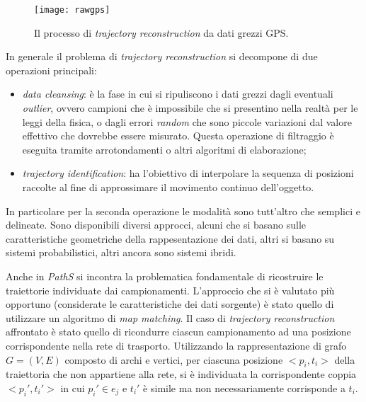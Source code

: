 \begin{figure}[h]
  \centering
  \texttt{[image: rawgps]}
  \caption{\footnotesize{Il processo di \emph{trajectory reconstruction} da dati grezzi GPS.}}
  \label{fig:rawgps}
\end{figure}

In generale il problema di \emph{trajectory reconstruction} si decompone di due operazioni principali:
\begin{itemize}
\item \emph{data cleansing}: è la fase in cui si ripuliscono i dati grezzi dagli eventuali \emph{outlier}, ovvero campioni che è impossibile che si presentino nella realtà per le leggi della fisica, o dagli errori \emph{random} che sono piccole variazioni dal valore effettivo che dovrebbe essere misurato. Questa operazione di filtraggio è eseguita tramite arrotondamenti o altri algoritmi di elaborazione;
\item \emph{trajectory identification}: ha l'obiettivo di interpolare la sequenza di posizioni raccolte al fine di approssimare il movimento continuo dell'oggetto.
\end{itemize}
In particolare per la seconda operazione le modalità sono tutt'altro che semplici e delineate. Sono disponibili diversi approcci, alcuni che si basano sulle caratteristiche geometriche della rappesentazione dei dati, altri si basano su sistemi probabilistici, altri ancora sono sistemi ibridi.

Anche in \emph{PathS} si incontra la problematica fondamentale di ricostruire le traiettorie individuate dai campionamenti. L'approccio che si è valutato più opportuno (considerate le caratteristiche dei dati sorgente) è stato quello di utilizzare un algoritmo di \emph{map matching}.
Il caso di \emph{trajectory reconstruction} affrontato è stato quello di ricondurre ciascun campionamento ad una posizione corrispondente nella rete di trasporto. Utilizzando la rappresentazione di grafo $G=(V,E)$ composto di archi e vertici, per ciascuna posizione $<p_i, t_i>$ della traiettoria che non appartiene alla rete, si è individuata la corrispondente coppia $<p_i', t_i'>$ in cui $p_i' \in e_j$ e $t_i'$ è simile ma non necessariamente corrisponde a $t_i$.

